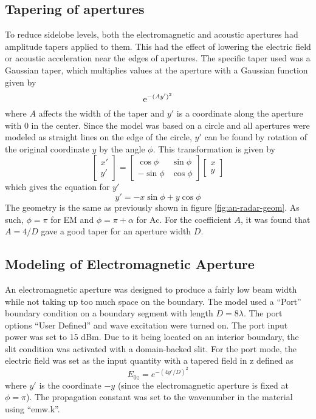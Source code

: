 \documentclass[11pt,twoside]{eitExjobb}
\begin{document}
	\subsection{Tapering of apertures}
	To reduce sidelobe levels, both the electromagnetic and acoustic apertures had amplitude tapers applied to them. \addref This had the effect of lowering the electric field or acoustic acceleration near the edges of apertures. The specific taper used was a Gaussian taper, which multiplies values at the aperture with a Gaussian function given by
	\begin{equation*}
	\mathrm{e}^{-(Ay')^2}
	\end{equation*}
	where $A$ affects the width of the taper and $y'$ is a coordinate along the aperture with 0 in the center. Since the model was based on a circle and all apertures were modeled as straight lines on the edge of the circle, $y'$ can be found by rotation of the original coordinate $y$ by the angle $\phi$. This transformation is given by \addref
	\begin{equation*}
		\begin{bmatrix}
			x' \\
			y'
		\end{bmatrix}
		=
		\begin{bmatrix}
			\cos{\phi} & \sin{\phi} \\
			-\sin{\phi} & \cos{\phi}
		\end{bmatrix}
		\begin{bmatrix}
			x \\
			y
		\end{bmatrix}
	\end{equation*}
	which gives the equation for $y'$
	\begin{equation*}
		y' = -x\sin{\phi} + y\cos{\phi}
	\end{equation*}
	The geometry is the same as previously shown in figure \ref{fig:an-radar-geom}. As such, $\phi = \pi$ for EM and $\phi = \pi + \alpha$ for Ac. For the coefficient $A$, it was found that $A = 4/D$ gave a good taper for an aperture width $D$.
	
	\subsection{Modeling of Electromagnetic Aperture}
	An electromagnetic aperture was designed to produce a fairly low beam width while not taking up too much space on the boundary. The model used a ``Port'' boundary condition on a boundary segment with length $D = 8\lambda$. The port options ``User Defined'' and wave excitation were turned on. The port input power was set to 15 dBm. Due to it being located on an interior boundary, the slit condition was activated with a domain-backed slit. For the port mode, the electric field was set as the input quantity with a tapered field in z defined as
	\begin{equation*}
		E_{0z} = e^{-(4y'/D)^2}
	\end{equation*}
	where $y'$ is the coordinate $-y$ (since the electromagnetic aperture is fixed at $\phi = \pi$). The propagation constant was set to the wavenumber in the material using ``emw.k''.
	
\end{document}

